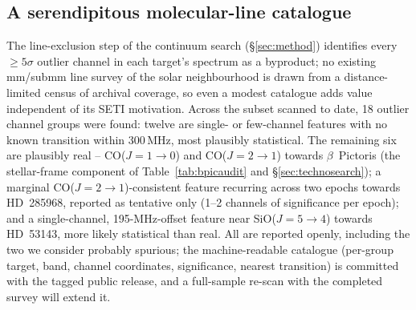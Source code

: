 \documentclass{openjournal}
\begin{document}
\subsection{A serendipitous molecular-line catalogue}
\label{sec:linecatalogue}

The line-exclusion step of the continuum search
(\S\ref{sec:method}) identifies every $\geq5\sigma$ outlier channel
in each target's spectrum as a byproduct; no existing mm/submm line
survey of the solar neighbourhood is drawn from a distance-limited
census of archival coverage, so even a modest catalogue adds value
independent of its SETI motivation. Across the subset scanned to
date, 18 outlier channel groups were found: twelve are single- or
few-channel features with no known transition within 300\,MHz, most
plausibly statistical. The remaining six are plausibly real --
CO($J{=}1{\to}0$) and CO($J{=}2{\to}1$) towards $\beta$~Pictoris
(the stellar-frame component of Table~\ref{tab:bpicaudit} and
\S\ref{sec:technosearch}); a marginal CO($J{=}2{\to}1$)-consistent
feature recurring across two epochs towards HD~285968, reported as
tentative only (1--2 channels of significance per epoch); and a
single-channel, 195-MHz-offset feature near SiO($J{=}5{\to}4$)
towards HD~53143, more likely statistical than real. All are
reported openly, including the two we consider probably spurious;
the machine-readable catalogue (per-group target, band, channel
coordinates, significance, nearest transition) is committed with the
tagged public release, and a full-sample re-scan with the completed
survey will extend it.
\end{document}
